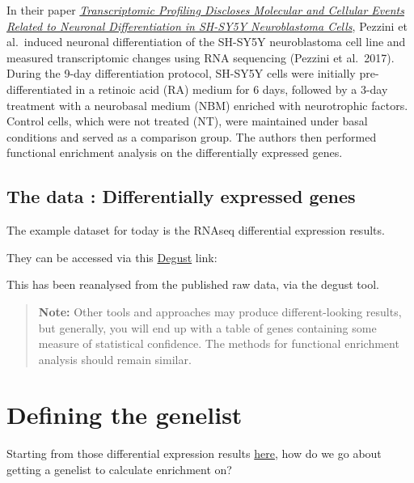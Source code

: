 \documentclass[
]{book}
\begin{document}
In their paper \href{https://link.springer.com/article/10.1007\%2Fs10571-016-0403-y}{\emph{Transcriptomic Profiling Discloses Molecular and Cellular Events Related to Neuronal Differentiation in SH-SY5Y Neuroblastoma Cells}}, Pezzini et al.~induced neuronal differentiation of the SH-SY5Y neuroblastoma cell line and measured transcriptomic changes using RNA sequencing (Pezzini et al.~2017). During the 9-day differentiation protocol, SH-SY5Y cells were initially pre-differentiated in a retinoic acid (RA) medium for 6 days, followed by a 3-day treatment with a neurobasal medium (NBM) enriched with neurotrophic factors. Control cells, which were not treated (NT), were maintained under basal conditions and served as a comparison group. The authors then performed functional enrichment analysis on the differentially expressed genes.

\hypertarget{the-data-differentially-expressed-genes}{%
\section{The data : Differentially expressed genes}\label{the-data-differentially-expressed-genes}}

The example dataset for today is the RNAseq differential expression results.

They can be accessed via this \href{http://degust.erc.monash.edu/degust/compare.html?code=5b2c7805ab8f8c5f2dc8c72e61b049b0\#?plot=mds}{Degust} link:

This has been reanalysed from the published raw data, via the degust tool.

\begin{quote}
\textbf{Note:} Other tools and approaches may produce different-looking results, but generally, you will end up with a table of genes containing some measure of statistical confidence. The methods for functional enrichment analysis should remain similar.
\end{quote}

\hypertarget{defining-the-genelist}{%
\chapter{Defining the genelist}\label{defining-the-genelist}}

Starting from those differential expression results \href{http://degust.erc.monash.edu/degust/compare.html?code=5b2c7805ab8f8c5f2dc8c72e61b049b0\#?plot=mds}{here}, how do we go about getting a genelist to calculate enrichment on?
\end{document}
